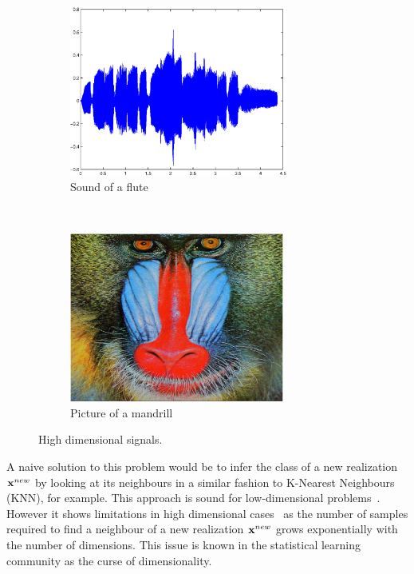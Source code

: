\documentclass[a4paper,11pt]{report}
\begin{document}
		\begin{figure}[h]
			\centering
			\begin{subfigure}[t]{0.48\textwidth}
				\centering
				\includegraphics[height=2.2in]{waveform_flute.eps}
				\caption{Sound of a flute}
			\end{subfigure}%
			~ 
			\begin{subfigure}[t]{0.48\textwidth}
        \centering
        \includegraphics[height=2.2in]{im_mandrill.eps}
        \caption{Picture of a mandrill}
			\end{subfigure}
			\caption{High dimensional signals.}
			\label{fig:highDim signals}
		\end{figure}
		
		A naive solution to this problem would be to infer the class of a new realization ${\bf x}^{new}$ by looking at its neighbours in a similar fashion to K-Nearest Neighbours (KNN), for example. This approach is sound for low-dimensional problems~\citep{cover1967nearest}. However it shows limitations in high dimensional cases~\citep{beyer1999nearest} as the number of samples required to find a neighbour of a new realization ${\bf x}^{new}$ grows exponentially with the number of dimensions. This issue is known in the statistical learning community as the curse of dimensionality.\\
			
\end{document}
